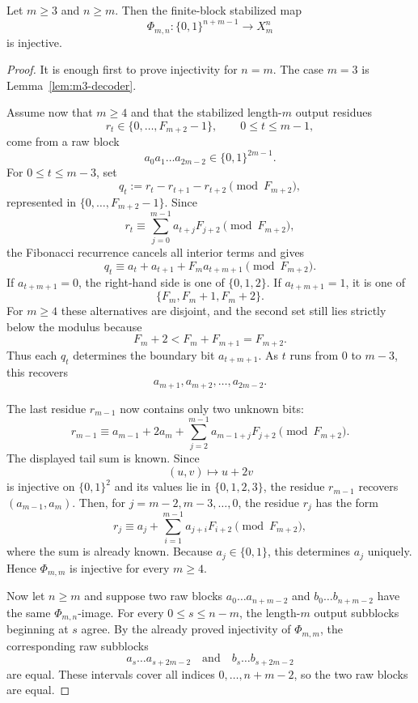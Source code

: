 \begin{theorem}\label{thm:block-invertibility}
Let $m\ge3$ and $n\ge m$.  Then the finite-block stabilized map
\[
\Phi_{m,n}:\{0,1\}^{n+m-1}\longrightarrow X_m^n
\]
is injective.
\end{theorem}

\begin{proof}
It is enough first to prove injectivity for $n=m$.  The case $m=3$ is
Lemma~\ref{lem:m3-decoder}.

Assume now that $m\ge4$ and that the stabilized length-$m$ output residues
\[
r_t\in\{0,\ldots,F_{m+2}-1\},\qquad 0\le t\le m-1,
\]
come from a raw block
\[
a_0a_1\ldots a_{2m-2}\in\{0,1\}^{2m-1}.
\]
For $0\le t\le m-3$, set
\[
q_t:=r_t-r_{t+1}-r_{t+2}\pmod {F_{m+2}},
\]
represented in $\{0,\ldots,F_{m+2}-1\}$.  Since
\[
r_t\equiv\sum_{j=0}^{m-1}a_{t+j}F_{j+2}\pmod {F_{m+2}},
\]
the Fibonacci recurrence cancels all interior terms and gives
\begin{equation}\label{eq:block-decoder-qt}
q_t\equiv a_t+a_{t+1}+F_m a_{t+m+1}\pmod {F_{m+2}}.
\end{equation}
If $a_{t+m+1}=0$, the right-hand side is one of $\{0,1,2\}$.  If
$a_{t+m+1}=1$, it is one of
\[
\{F_m,F_m+1,F_m+2\}.
\]
For $m\ge4$ these alternatives are disjoint, and the second set still lies
strictly below the modulus because
\[
F_m+2 < F_m+F_{m+1}=F_{m+2}.
\]
Thus each $q_t$ determines the boundary bit $a_{t+m+1}$.  As $t$ runs from
$0$ to $m-3$, this recovers
\[
a_{m+1},a_{m+2},\ldots,a_{2m-2}.
\]

The last residue $r_{m-1}$ now contains only two unknown bits:
\[
r_{m-1}\equiv
a_{m-1}+2a_m+\sum_{j=2}^{m-1}a_{m-1+j}F_{j+2}
\pmod {F_{m+2}}.
\]
The displayed tail sum is known.  Since
\[
(u,v)\mapsto u+2v
\]
is injective on $\{0,1\}^2$ and its values lie in $\{0,1,2,3\}$, the residue
$r_{m-1}$ recovers $(a_{m-1},a_m)$.  Then, for
$j=m-2,m-3,\ldots,0$, the residue $r_j$ has the form
\[
r_j\equiv a_j+\sum_{i=1}^{m-1}a_{j+i}F_{i+2}\pmod {F_{m+2}},
\]
where the sum is already known.  Because $a_j\in\{0,1\}$, this determines
$a_j$ uniquely.  Hence $\Phi_{m,m}$ is injective for every $m\ge4$.

Now let $n\ge m$ and suppose two raw blocks
$a_0\ldots a_{n+m-2}$ and $b_0\ldots b_{n+m-2}$ have the same
$\Phi_{m,n}$-image.  For every $0\le s\le n-m$, the length-$m$ output
subblocks beginning at $s$ agree.  By the already proved injectivity of
$\Phi_{m,m}$, the corresponding raw subblocks
\[
a_s\ldots a_{s+2m-2}
\quad\text{and}\quad
b_s\ldots b_{s+2m-2}
\]
are equal.  These intervals cover all indices $0,\ldots,n+m-2$, so the two
raw blocks are equal.
\end{proof}

